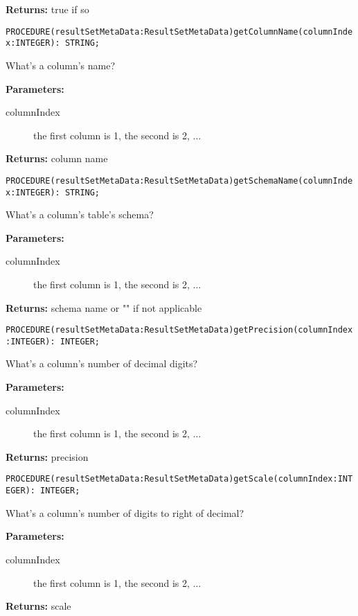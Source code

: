 {\bf Returns: } 
true if so 



\verb'PROCEDURE(resultSetMetaData:ResultSetMetaData)getColumnName(columnIndex:INTEGER): STRING;'

What's a column's name? 


{\bf Parameters: }
\begin{description}
\item[columnIndex] the first column is 1, the second is 2, ... 
\end{description}

{\bf Returns: } 
column name 



\verb'PROCEDURE(resultSetMetaData:ResultSetMetaData)getSchemaName(columnIndex:INTEGER): STRING;'

What's a column's table's schema? 

{\bf Parameters: }
\begin{description}
\item[columnIndex] the first column is 1, the second is 2, ... 
\end{description}

{\bf Returns: } 
schema name or "" if not applicable 



\verb'PROCEDURE(resultSetMetaData:ResultSetMetaData)getPrecision(columnIndex:INTEGER): INTEGER;'

What's a column's number of decimal digits? 

{\bf Parameters: }
\begin{description}
\item[columnIndex] the first column is 1, the second is 2, ... 
\end{description}

{\bf Returns: } 
precision 



\verb'PROCEDURE(resultSetMetaData:ResultSetMetaData)getScale(columnIndex:INTEGER): INTEGER;'

What's a column's number of digits to right of decimal? 


{\bf Parameters: }
\begin{description}
\item[columnIndex] the first column is 1, the second is 2, ... 
\end{description}

{\bf Returns: } 
scale 


